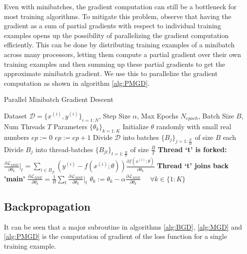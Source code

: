 Even with minibatches, the gradient computation can still be a bottleneck for most training algorithms.
To mitigate this problem, observe that having the gradient as a sum of partial gradients with respect to individual training examples opens up the possibility of parallelizing the gradient computation efficiently.
This can be done by distributing training examples of a minibatch across many processors, letting them compute a partial gradient over their own training examples and then summing up these partial gradients to get the approximate minibatch gradient.
We use this to parallelize the gradient computation as shown in algorithm \ref{alg:PMGD}.
\begin{algorithm}[tb]
   \caption{Parallel Minibatch Gradient Descent}
   \label{alg:PMGD}
\begin{algorithmic}
    Dataset $\mathcal{D} = \{x^{(i)},y^{(i)}\}_{i=1:N}$, Step Size $\alpha$, Max Epochs $N_{epoch}$, Batch Size $B$, Num Threads $T$
    Parameters $\{\theta_k\}_{k=1:K}$
   \STATE
   \STATE Initialize $\theta$ randomly with small real numbers
   \STATE $ep := 0$
   \REPEAT
   \STATE $ep := ep + 1$
   \STATE Divide $\mathcal{D}$ into batches $\{B_j\}_{j=1:\frac{N}{B}}$ of size $B$ each
   \STATE Divide $B_j$ into thread-batches $\{B_{jt}\}_{t=1:\frac{B}{T}}$ of size $\frac{B}{T}$
   \STATE \textbf{Thread `t' is forked:}
   \STATE $\frac{\partial \mathcal{L}_{MSE}}{\partial \theta_k} \big|_t = \sum_{i \in B_{jt}} ( y^{(i)} - f(x^{(i)}; \theta)) \frac{\partial f(x^{(i)}; \theta)}{\partial \theta_k}$
   \ENDFOR
   \STATE \textbf{Thread `t' joins back 'main'}
   \STATE $\frac{\partial \mathcal{L}_{MSE}}{\partial \theta_k} = \frac{1}{B} \sum_t \frac{\partial \mathcal{L}_{MSE}}{\partial \theta_k} \big|_t$
   \ENDFOR
   \STATE $\theta_k := \theta_k - \alpha \frac{\partial \mathcal{L}_{MSE}}{\partial \theta_k} \hspace{16pt} \forall k \in \{1:K\}$
   \ENDFOR
\end{algorithmic}
\end{algorithm}

\subsection{Backpropagation}
\label{sub:BackProp}

It can be seen that a major subroutine in algorithms \ref{alg:BGD}, \ref{alg:MGD} and \ref{alg:PMGD} is the computation of gradient of the loss function for a single training example.

